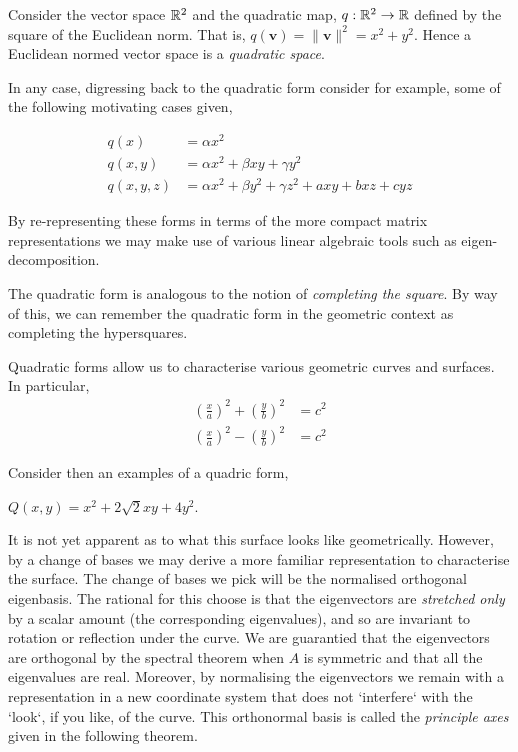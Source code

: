 \begin{exmp}
 Consider the vector space $\mathbb{R}^2$ and the quadratic map,
 $q : \mathbb{R}^2 \to \mathbb{R}$ defined by the square of the Euclidean norm.
 That is, $q(\mathbf{v}) = \| \mathbf{v} \|^2 = x^2 + y^2$.
 Hence a Euclidean normed vector space is a \emph{quadratic space}.
\end{exmp}

In any case, digressing back to the quadratic form consider for example,
some of the following motivating cases given,
\begin{exmp}
\begin{align*}
 q(x) &= \alpha x^2 \tag{unary}
 \\
 q(x,y) &= \alpha x^2 + \beta x y + \gamma y^2 \tag{binary}
 \\
 q(x,y,z) &= \alpha x^2 + \beta y^2 + \gamma z^2 + a xy + b xz + c yz \tag{ternary}
\end{align*}
\end{exmp}
By re-representing these forms in terms of the more compact matrix
representations we may make use of various linear algebraic tools
such as eigen-decomposition.

\begin{rem}
 The quadratic form is analogous to the notion of \emph{completing the square}.
 By way of this, we can remember the quadratic form in the geometric context as
 completing the hypersquares.
\end{rem}

Quadratic forms allow us to characterise various geometric curves and surfaces.
In particular,
\begin{align*}
 \left( \frac{x}{a} \right)^2 + \left( \frac{y}{b} \right)^2 &= c^2 \tag{eclipse}
 \\
 \left( \frac{x}{a} \right)^2 - \left( \frac{y}{b} \right)^2 &= c^2 \tag{hyperbola}
\end{align*}

Consider then an examples of a quadric form,
\begin{exmp}
 $Q(x,y) = x^2 + 2 \sqrt{2} xy + 4y^2$.
\end{exmp}
It is not yet apparent as to what this surface looks like geometrically. However,
by a change of bases we may derive a more familiar representation to characterise
the surface. The change of bases we pick will be the normalised orthogonal eigenbasis.
The rational for this choose is that the eigenvectors are \emph{stretched only} by
a scalar amount (the corresponding eigenvalues), and so are invariant to rotation or
reflection under the curve. We are guarantied that the eigenvectors are orthogonal by
the spectral theorem when $A$ is symmetric and that all the eigenvalues are real.
Moreover, by normalising the eigenvectors we remain with a representation in a new
coordinate system that does not `interfere` with the `look`, if you like, of the curve.
This orthonormal basis is called the \emph{principle axes} given in the following theorem.

